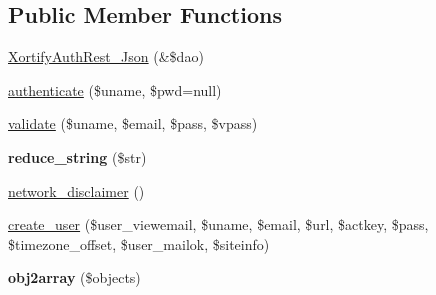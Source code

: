 \subsection*{Public Member Functions}
\begin{DoxyCompactItemize}
\item 
\hyperlink{class_xortify_auth_rest___json_a49655248be6ee9b8888388b9137f433c}{Xortify\-Auth\-Rest\-\_\-\-Json} (\&\$dao)
\item 
\hyperlink{class_xortify_auth_rest___json_a00678ba307326b734e6c679f28bea315}{authenticate} (\$uname, \$pwd=null)
\item 
\hyperlink{class_xortify_auth_rest___json_a91121a1b702dfd20fb65a027c8ed26ec}{validate} (\$uname, \$email, \$pass, \$vpass)
\item 
\hypertarget{class_xortify_auth_rest___json_ae463a3baa44e95fa5b5151ab2334df1c}{{\bfseries reduce\-\_\-string} (\$str)}\label{class_xortify_auth_rest___json_ae463a3baa44e95fa5b5151ab2334df1c}

\item 
\hyperlink{class_xortify_auth_rest___json_a1874c27b6f81a3f2ff9015405ad0f8bc}{network\-\_\-disclaimer} ()
\item 
\hyperlink{class_xortify_auth_rest___json_ac72efc5ad313a592cf6706876f56f7ec}{create\-\_\-user} (\$user\-\_\-viewemail, \$uname, \$email, \$url, \$actkey, \$pass, \$timezone\-\_\-offset, \$user\-\_\-mailok, \$siteinfo)
\item 
\hypertarget{class_xortify_auth_rest___json_aabc52e4f78557f0e0b360a8aaba6e11d}{{\bfseries obj2array} (\$objects)}\label{class_xortify_auth_rest___json_aabc52e4f78557f0e0b360a8aaba6e11d}

\end{DoxyCompactItemize}
